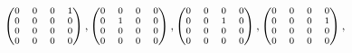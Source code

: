 \documentclass[11pt]{article}
\begin{document}
\vspace{-2mm}                       
$ \hspace{13mm} \scriptsize{           \begin{pmatrix}
                        0&0&0&1\\
                        0&0&0&0\\
                        0&0&0&0\\
                        0&0&0&0\\
                        \end{pmatrix},
                        \begin{pmatrix}
                        0&0&0&0\\
                        0&1&0&0\\
                        0&0&0&0\\
                        0&0&0&0\\
                        \end{pmatrix},
                        \begin{pmatrix}
                        0&0&0&0\\
                        0&0&1&0\\
                        0&0&0&0\\
                        0&0&0&0\\
                        \end{pmatrix},
                        \begin{pmatrix}
                        0&0&0&0\\
                        0&0&0&1\\
                        0&0&0&0\\
                        0&0&0&0\\
                        \end{pmatrix},}$ \\[4pt]
      
\end{document}
